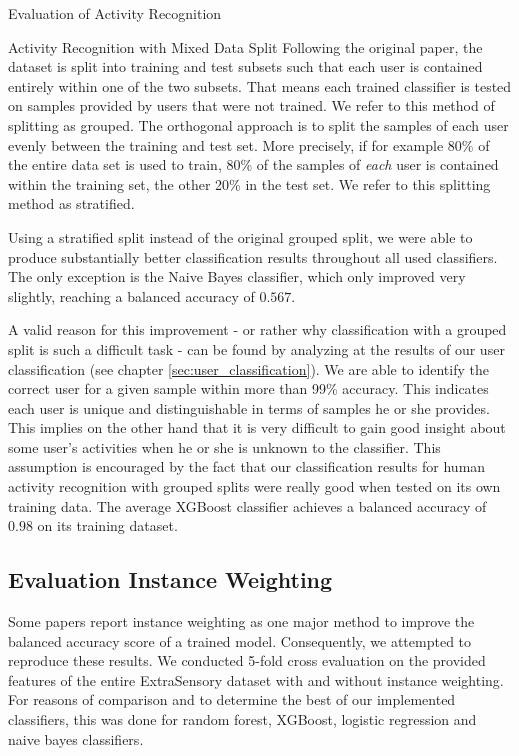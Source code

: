 \begin{section}{Evaluation of Activity Recognition}
	\begin{subsection}{Activity Recognition with Mixed Data Split}\label{subsec:stratified}
		Following the original paper, the dataset is split into training and test subsets such that each user is contained entirely within one of the two subsets. That means each trained classifier is tested on samples provided by users that were not trained. We refer to this method of splitting as \glqq grouped\grqq{}. The orthogonal approach is to split the samples of each user evenly between the training and test set. More precisely, if for example 80\% of the entire data set is used to train, 80\% of the samples of \emph{each} user is contained within the training set, the other 20\% in the test set. We refer to this splitting method as \glqq stratified\grqq{}. \par
		Using a stratified split instead of the original grouped split, we were able to produce substantially better classification results throughout all used classifiers. The only exception is the Naive Bayes classifier, which only improved very slightly, reaching a balanced accuracy of $0.567$. \par
		A valid reason for this improvement - or rather why classification with a grouped split is such a difficult task - can be found by analyzing at the results of our user classification (see chapter \ref{sec:user_classification}). We are able to identify the correct user for a given sample within more than 99\% accuracy. This indicates each user is unique and distinguishable in terms of samples he or she provides. This implies on the other hand that it is very difficult to gain good insight about some user's activities when he or she is unknown to the classifier. This assumption is encouraged by the fact that our classification results for human activity recognition with grouped splits were really good when tested on its own training data. The average XGBoost classifier achieves a balanced accuracy of $0.98$ on its training dataset. 
	\end{subsection}
	
	\subsection{Evaluation Instance Weighting} \label{sec:instance_weighting}
	
	Some papers report instance weighting as one major method to improve the balanced accuracy score of a trained model. Consequently, we attempted to reproduce these results. We conducted 5-fold cross evaluation on the provided features of the entire ExtraSensory dataset with and without instance weighting. For reasons of comparison and to determine the best of our implemented classifiers, this was done for random forest, XGBoost, logistic regression and naive bayes classifiers. 
	

\end{section}
